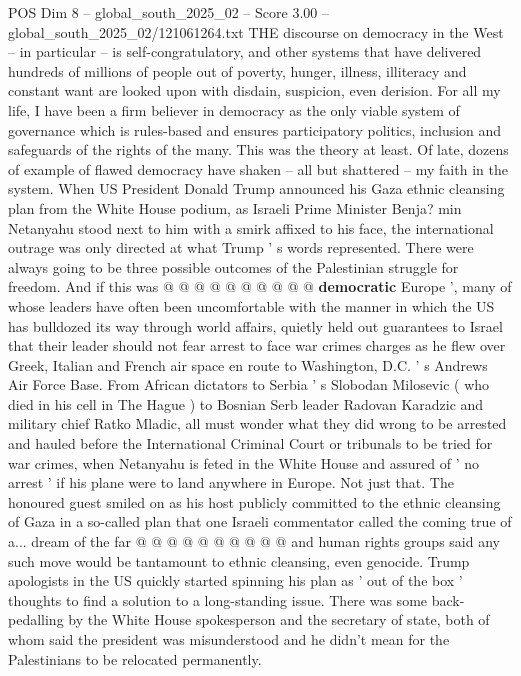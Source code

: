 \begin{textsample}{POS Dim 8 – global\_south\_2025\_02 – Score 3.00 – global\_south\_2025\_02/121061264.txt}  \label{ex:f8_pos_398}
THE discourse on democracy in the West -- in particular -- is self-congratulatory, and other systems that have delivered hundreds of millions of people out of poverty, hunger, illness, illiteracy and constant want are looked upon with disdain, suspicion, even derision.
For all my life, I have been a firm believer in democracy as the only viable system of governance which is rules-based and ensures participatory politics, inclusion and safeguards of the rights of the many.
This was the theory at least.
Of late, dozens of example of flawed democracy have shaken -- all but shattered -- my faith in the system.
When US President Donald Trump announced his Gaza ethnic cleansing plan from the White House podium, as Israeli Prime Minister Benja? min Netanyahu stood next to him with a smirk affixed to his face, the international outrage was only directed at what Trump ' s words represented.
There were always going to be three possible outcomes of the Palestinian struggle for freedom.
And if this was @ @ @ @ @ @ @ @ @ @ \textbf{democratic} Europe ', many of whose leaders have often been uncomfortable with the manner in which the US has bulldozed its way through world affairs, quietly held out guarantees to Israel that their leader should not fear arrest to face war crimes charges as he flew over Greek, Italian and French air space en route to Washington, D.C. ' s Andrews Air Force Base.
From African dictators to Serbia ' s Slobodan Milosevic ( who died in his cell in The Hague ) to Bosnian Serb leader Radovan Karadzic and military chief Ratko Mladic, all must wonder what they did wrong to be arrested and hauled before the International Criminal Court or tribunals to be tried for war crimes, when Netanyahu is feted in the White House and assured of ' no arrest ' if his plane were to land anywhere in Europe.
Not just that.
The honoured guest smiled on as his host publicly committed to the ethnic cleansing of Gaza in a so-called plan that one Israeli commentator called the coming true of a... dream of the far @ @ @ @ @ @ @ @ @ @ and human rights groups said any such move would be tantamount to ethnic cleansing, even genocide.
Trump apologists in the US quickly started spinning his plan as ' out of the box ' thoughts to find a solution to a long-standing issue.
There was some back-pedalling by the White House spokesperson and the secretary of state, both of whom said the president was misunderstood and he didn't mean for the Palestinians to be relocated permanently.

\end{textsample}
